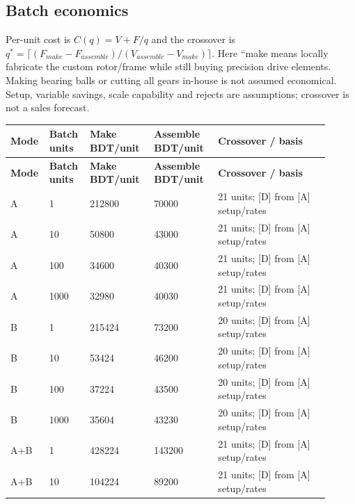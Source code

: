 \documentclass[11pt,a4paper]{article}
\begin{document}
\subsection{Batch economics}
Per-unit cost is $C(q)=V+F/q$ and the crossover is $q^*=\lceil(F_{make}-F_{assemble})/(V_{assemble}-V_{make})\rceil$. Here ``make means locally fabricate the custom rotor/frame while still buying precision drive elements. Making bearing balls or cutting all gears in-house is not assumed economical. Setup, variable savings, scale capability and rejects are assumptions; crossover is not a sales forecast.

{\small
\setlength{\tabcolsep}{3pt}\renewcommand{\arraystretch}{1.18}
\begin{longtable}{@{}>{\raggedright\arraybackslash}p{0.0666\linewidth}>{\raggedright\arraybackslash}p{0.1110\linewidth}>{\raggedright\arraybackslash}p{0.1998\linewidth}>{\raggedright\arraybackslash}p{0.1998\linewidth}>{\raggedright\arraybackslash}p{0.3329\linewidth}@{}}
\toprule \textbf{Mode} & \textbf{Batch units} & \textbf{Make BDT/unit} & \textbf{Assemble BDT/unit} & \textbf{Crossover / basis} \\ \midrule
\endfirsthead\toprule \textbf{Mode} & \textbf{Batch units} & \textbf{Make BDT/unit} & \textbf{Assemble BDT/unit} & \textbf{Crossover / basis} \\ \midrule
\endhead\bottomrule\endfoot
A & \num{1} & \num{212800} & \num{70000} & \num{21} units; [D] from [A] setup/rates \\
A & \num{10} & \num{50800} & \num{43000} & \num{21} units; [D] from [A] setup/rates \\
A & \num{100} & \num{34600} & \num{40300} & \num{21} units; [D] from [A] setup/rates \\
A & \num{1000} & \num{32980} & \num{40030} & \num{21} units; [D] from [A] setup/rates \\
B & \num{1} & \num{215424} & \num{73200} & \num{20} units; [D] from [A] setup/rates \\
B & \num{10} & \num{53424} & \num{46200} & \num{20} units; [D] from [A] setup/rates \\
B & \num{100} & \num{37224} & \num{43500} & \num{20} units; [D] from [A] setup/rates \\
B & \num{1000} & \num{35604} & \num{43230} & \num{20} units; [D] from [A] setup/rates \\
A+B & \num{1} & \num{428224} & \num{143200} & \num{21} units; [D] from [A] setup/rates \\
A+B & \num{10} & \num{104224} & \num{89200} & \num{21} units; [D] from [A] setup/rates \\

\end{longtable}}
\end{document}
